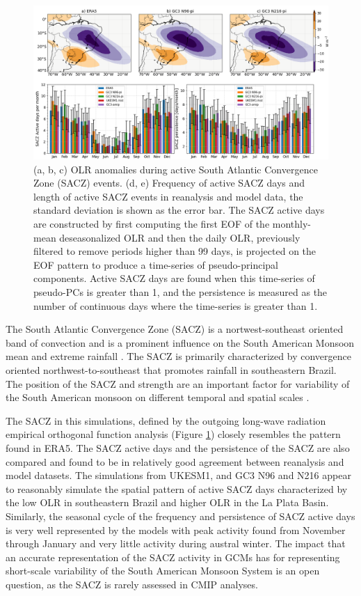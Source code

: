 \begin{figure}[t!]
\includegraphics[width=\linewidth]{figures/saczanalysis.png}
\caption[SACZ assessment in UKESM1 and HadGEM3]{(a, b, c) OLR anomalies during active South Atlantic Convergence Zone (SACZ) events. (d, e) Frequency of active SACZ days and length of active SACZ events in reanalysis and model data, the standard deviation is shown as the error bar. The SACZ active days are constructed by first computing the first EOF of the monthly-mean deseasonalized OLR and then the daily OLR, previously filtered to remove periods higher than 99 days, is projected on the EOF pattern to produce a time-series of pseudo-principal components. Active SACZ days are found when this time-series of pseudo-PCs is greater than 1, and the persistence is measured as the number of continuous days where the time-series is greater than 1.}
\label{fig:sacz}
\end{figure}

 The South Atlantic Convergence Zone (SACZ) is a nortwest-southeast oriented band of convection and is a prominent influence on the South American Monsoon mean and extreme rainfall \citep{carvalho2004,marengo2012,jorgetti2014}. The SACZ is primarily characterized by convergence oriented northwest-to-southeast that promotes rainfall in southeastern Brazil. The position of the SACZ and strength are an important factor for variability of the South American monsoon on different temporal and spatial scales \citep{carvalho2004,marengo2012,jorgetti2014}. 
 
 The SACZ in this simulations, defined by the outgoing long-wave radiation empirical orthogonal function analysis (Figure \ref{fig:sacz}) closely resembles the pattern found in ERA5. The SACZ active days and the persistence of the SACZ are also compared and found to be in relatively good agreement between reanalysis and model datasets.
The simulations from UKESM1, and GC3 N96 and N216 appear to reasonably simulate the spatial pattern of active SACZ days characterized by the low OLR in southeastern Brazil and higher OLR in the La Plata Basin. Similarly, the seasonal cycle of the frequency and persistence of SACZ active days is very well represented by the models with peak activity found from November through January and very little activity during austral winter. The impact that an accurate representation of the SACZ activity in GCMs has for representing short-scale variability of the South American Monsoon System is an open question, as the SACZ is rarely assessed in CMIP analyses.


